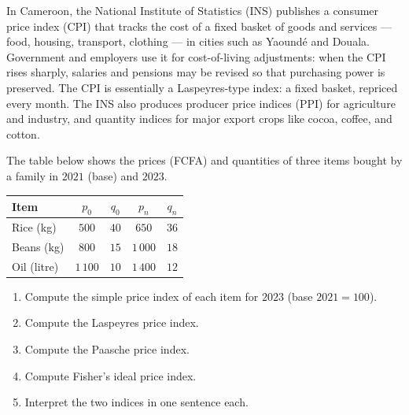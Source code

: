 \documentclass[11pt]{article}
\newcommand{\cle}[1]{{\popxbold\color{popdark}#1}}
\begin{document}
\begin{savaistu}
In Cameroon, the National Institute of Statistics (INS) publishes a \cle{consumer price index} (CPI) that tracks the cost of a fixed basket of goods and services — food, housing, transport, clothing — in cities such as Yaoundé and Douala. Government and employers use it for \cle{cost-of-living adjustments}: when the CPI rises sharply, salaries and pensions may be revised so that purchasing power is preserved. The CPI is essentially a Laspeyres-type index: a fixed basket, repriced every month. The INS also produces \cle{producer price indices} (PPI) for agriculture and industry, and \cle{quantity indices} for major export crops like cocoa, coffee, and cotton.
\end{savaistu}

\begin{exercice}
The table below shows the prices (FCFA) and quantities of three items bought by a family in $2021$ (base) and $2023$.
\begin{center}
\begin{tabular}{|l|c|c|c|c|}
\hline
\rowcolor{popblueL} Item & $p_0$ & $q_0$ & $p_n$ & $q_n$ \\
\hline
Rice (kg) & $500$ & $40$ & $650$ & $36$ \\
\hline
Beans (kg) & $800$ & $15$ & $1\,000$ & $18$ \\
\hline
Oil (litre) & $1\,100$ & $10$ & $1\,400$ & $12$ \\
\hline
\end{tabular}
\end{center}
\begin{enumerate}
\item Compute the simple price index of each item for $2023$ (base $2021 = 100$).
\item Compute the Laspeyres price index.
\item Compute the Paasche price index.
\item Compute Fisher's ideal price index.
\item Interpret the two indices in one sentence each.
\end{enumerate}
\end{exercice}
\end{document}
